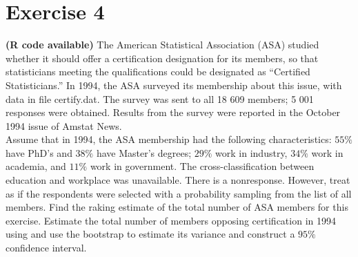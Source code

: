 \documentclass[12pt]{article}
\begin{document}
\section*{Exercise 4}
\textbf{\color{ForestGreen}(R code available)} The American Statistical Association (ASA) studied whether it should offer a certification
designation for its members, so that statisticians meeting the qualifications
could be designated as “Certified Statisticians.” In 1994, the ASA surveyed its membership
about this issue, with data in file certify.dat. The survey was sent to all 18 609
members; 5 001 responses were obtained. Results from the survey were reported in the October 1994 issue of Amstat News.\\
Assume that in 1994, the ASA membership had the following characteristics: $55\%$
have PhD’s and $38\%$ have Master’s degrees; $29\%$ work in industry, $34\%$ work in
academia, and $11\%$ work in government. The cross-classification between education
and workplace was unavailable. There is a nonresponse. However, treat as if the respondents were selected with a probability sampling from the list of all members. Find the raking estimate of the total number of ASA members for this exercise. Estimate the total number of members opposing certification in 1994 using and use the bootstrap to estimate its variance and construct a $95\%$ confidence interval.\\
\end{document}
